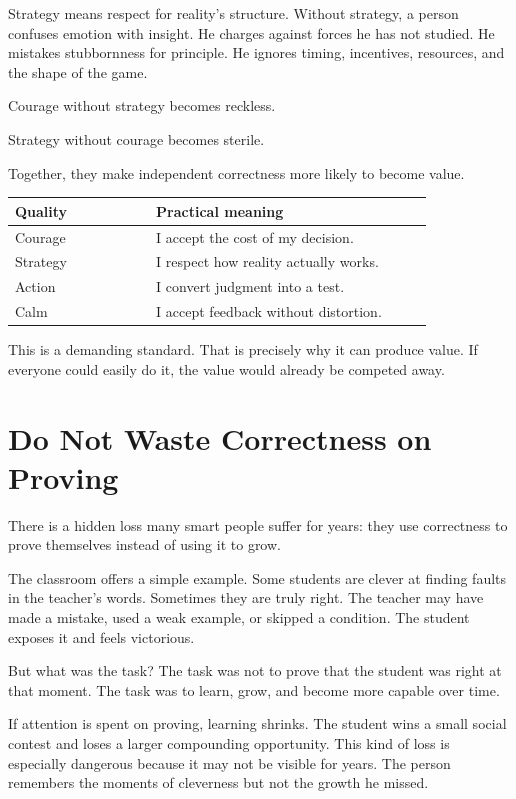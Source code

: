 Strategy means respect for reality's structure. Without strategy, a person confuses emotion with insight. He charges against forces he has not studied. He mistakes stubbornness for principle. He ignores timing, incentives, resources, and the shape of the game.

Courage without strategy becomes reckless.

Strategy without courage becomes sterile.

Together, they make independent correctness more likely to become value.

\begin{center}
\begin{tabular}{p{0.28\linewidth}p{0.55\linewidth}}
\hline
Quality & Practical meaning \\
\hline
Courage & I accept the cost of my decision. \\
Strategy & I respect how reality actually works. \\
Action & I convert judgment into a test. \\
Calm & I accept feedback without distortion. \\
\hline
\end{tabular}
\end{center}

This is a demanding standard. That is precisely why it can produce value. If everyone could easily do it, the value would already be competed away.

\section*{Do Not Waste Correctness on Proving}

There is a hidden loss many smart people suffer for years: they use correctness to prove themselves instead of using it to grow.

The classroom offers a simple example. Some students are clever at finding faults in the teacher's words. Sometimes they are truly right. The teacher may have made a mistake, used a weak example, or skipped a condition. The student exposes it and feels victorious.

But what was the task? The task was not to prove that the student was right at that moment. The task was to learn, grow, and become more capable over time.

If attention is spent on proving, learning shrinks. The student wins a small social contest and loses a larger compounding opportunity. This kind of loss is especially dangerous because it may not be visible for years. The person remembers the moments of cleverness but not the growth he missed.

